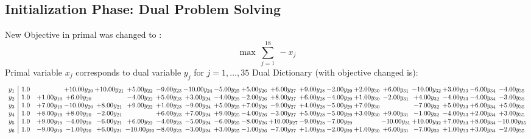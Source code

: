 \documentclass[9pt]{article}
\begin{document}
\subsection{Initialization Phase: Dual Problem Solving}
New Objective in primal was changed to : \[ \max\ \sum_{j=1}^{18}\ - x_j \] 
Primal variable $x_j$ corresponds to dual variable $y_j$ for $j = 1,\ldots,35$
Dual Dictionary (with objective changed is): 
\[\begin{array}{c| c c@{\hskip 2pt} c@{\hskip 2pt} c@{\hskip 2pt} c@{\hskip 2pt} c@{\hskip 2pt} c@{\hskip 2pt} c@{\hskip 2pt} c@{\hskip 2pt} c@{\hskip 2pt} c@{\hskip 2pt} c@{\hskip 2pt} c@{\hskip 2pt} c@{\hskip 2pt} c@{\hskip 2pt} c@{\hskip 2pt} c@{\hskip 2pt} c@{\hskip 2pt} }
 y_{1}   &  1.0  &   & + 10.00 y_{20} & + 10.00 y_{21} & +  5.00 y_{22} & -9.00 y_{23} & -10.00 y_{24} & -5.00 y_{25} & +  5.00 y_{26} & +  6.00 y_{27} & +  9.00 y_{28} & -2.00 y_{29} & +  2.00 y_{30} & +  6.00 y_{31} & -10.00 y_{32} & +  3.00 y_{33} & -6.00 y_{34} & -4.00 y_{35}\\
 y_{2}   &  1.0 & +  1.00 y_{19} & +  6.00 y_{20} &   & -4.00 y_{22} & +  5.00 y_{23} & +  3.00 y_{24} & -4.00 y_{25} & -2.00 y_{26} & +  8.00 y_{27} & +  6.00 y_{28} & -4.00 y_{29} & +  1.00 y_{30} & -2.00 y_{31} & +  4.00 y_{32} & -4.00 y_{33} & -4.00 y_{34} & -3.00 y_{35}\\
 y_{3}   &  1.0 & +  7.00 y_{19} & -10.00 y_{20} & +  8.00 y_{21} & +  9.00 y_{22} & +  1.00 y_{23} & -9.00 y_{24} & +  5.00 y_{25} & +  7.00 y_{26} & -9.00 y_{27} & +  4.00 y_{28} & -5.00 y_{29} & +  7.00 y_{30} &   & -7.00 y_{32} & +  5.00 y_{33} & +  6.00 y_{34} & +  5.00 y_{35}\\
 y_{4}   &  1.0 & +  8.00 y_{19} & +  8.00 y_{20} & -2.00 y_{21} &   & +  6.00 y_{23} & +  7.00 y_{24} & +  9.00 y_{25} & -4.00 y_{26} & -3.00 y_{27} & +  5.00 y_{28} & -5.00 y_{29} & +  3.00 y_{30} & +  9.00 y_{31} & -1.00 y_{32} & -4.00 y_{33} & +  2.00 y_{34} & +  3.00 y_{35}\\
 y_{5}   &  1.0 & +  9.00 y_{19} & -4.00 y_{20} & -6.00 y_{21} & +  6.00 y_{22} & -4.00 y_{23} & -5.00 y_{24} & -6.00 y_{25} & -8.00 y_{26} & + 10.00 y_{27} & -9.00 y_{28} & -7.00 y_{29} &   & -10.00 y_{31} & + 10.00 y_{32} & +  7.00 y_{33} & +  8.00 y_{34} & -10.00 y_{35}\\
 y_{6}   &  1.0 & -9.00 y_{19} & -1.00 y_{20} & +  6.00 y_{21} & -10.00 y_{22} & -8.00 y_{23} & -3.00 y_{24} & +  3.00 y_{25} & -1.00 y_{26} & -7.00 y_{27} & +  1.00 y_{28} & -2.00 y_{29} & +  1.00 y_{30} & +  6.00 y_{31} & -7.00 y_{32} & +  1.00 y_{33} & +  3.00 y_{34} & -2.00 y_{35}\\

\end{array}\]
\end{document}
